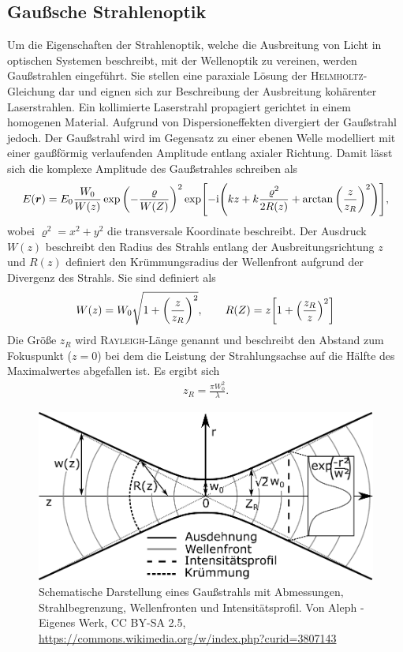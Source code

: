 \documentclass[a4paper,twoside,final]{article}
\begin{document}
\subsection{Gaußsche Strahlenoptik}
Um die Eigenschaften der Strahlenoptik, welche die Ausbreitung von Licht in optischen Systemen beschreibt, mit der Wellenoptik zu vereinen, werden Gaußstrahlen eingeführt. Sie stellen eine paraxiale Lösung der \textsc{Helmholtz}-Gleichung dar und eignen sich zur Beschreibung der Ausbreitung kohärenter Laserstrahlen. Ein kollimierte Laserstrahl propagiert gerichtet in einem homogenen Material. Aufgrund von Dispersioneffekten divergiert der Gaußstrahl jedoch. Der Gaußstrahl wird im Gegensatz zu einer ebenen Welle modelliert mit einer gaußförmig verlaufenden Amplitude entlang axialer Richtung. Damit lässt sich die komplexe Amplitude des Gaußstrahles schreiben als~\cite{Saleh}
\begin{align}
  E(\bm{r}) = E_0 \frac{W_0}{W(z)} \exp\qty(-\frac{\varrho}{W(Z)})^2 \exp[-\mathrm{i}\qty(kz + k \frac{\varrho^2}{2R(z)}+ \arctan\qty(\frac{z}{z_R})^2)],
\end{align}
wobei $\varrho^2 = x^2 + y^2$ die transversale Koordinate beschreibt. Der Ausdruck $W(z)$ beschreibt den Radius des Strahls entlang der Ausbreitungsrichtung $z$ und $R(z)$ definiert den Krümmungsradius der Wellenfront aufgrund der Divergenz des Strahls. Sie sind definiert als
\begin{align}\label{eqn:Strahlradius_Krümmung}
  W(z) = W_0 \sqrt{1+\qty(\frac{z}{z_R})^2}, \qquad R(Z) = z \qty[1+\qty(\frac{z_R}{z})^2]
\end{align}
Die Größe $z_R$ wird \textsc{Rayleigh}-Länge genannt und beschreibt den Abstand zum Fokuspunkt ($z=0$) bei dem die Leistung der Strahlungsachse auf die Hälfte des Maximalwertes abgefallen ist. Es ergibt sich
\begin{align}\label{eqn:z_r}
  z_R = \frac{\pi W_0^2}{\lambda}.
\end{align}

\begin{figure}[htp]
  \centering
  \includegraphics[width=.7\textwidth]{Bilder/Gauss_Strahl.pdf}
  \caption{Schematische Darstellung eines Gaußstrahls mit Abmessungen, Strahlbegrenzung, Wellenfronten und Intensitätsprofil. Von Aleph - Eigenes Werk, CC BY-SA 2.5, \url{https://commons.wikimedia.org/w/index.php?curid=3807143}}
  \label{fig:Gauss_Strahl}
\end{figure}
\end{document}

